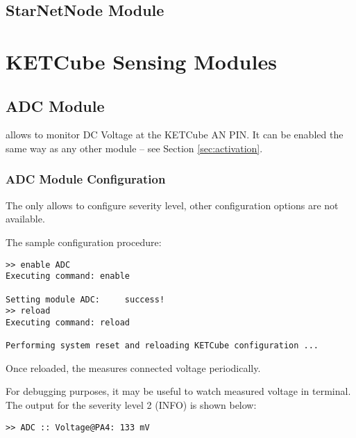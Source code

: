
\clearpage
\subsection{StarNetNode Module}



\clearpage
\section{KETCube Sensing Modules}

\subsection{ADC Module}
 allows to monitor DC Voltage at the KETCube AN PIN. It can be enabled the same way as any other module -- see Section \ref{sec:activation}.

\subsubsection{ADC Module Configuration}
  The  only allows to configure severity level, other configuration options are not available.
  
  The sample configuration procedure:
  
\begin{docCodeExample}
\begin{verbatim}
>> enable ADC
Executing command: enable

Setting module ADC:     success!
>> reload
Executing command: reload

Performing system reset and reloading KETCube configuration ...
\end{verbatim}
\end{docCodeExample}
  
  Once reloaded, the  measures connected voltage periodically. 
  
  For debugging purposes, it may be useful to watch measured voltage in terminal. The output for the severity level 2 (INFO) is shown below:
  
\begin{docCodeExample}
\begin{verbatim}
>> ADC :: Voltage@PA4: 133 mV
\end{verbatim}
\end{docCodeExample}

